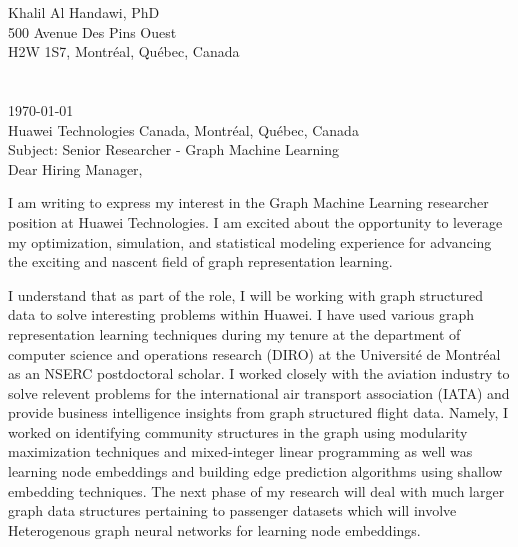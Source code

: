 \documentclass[12pt]{article} %
\begin{document}

Khalil Al Handawi, PhD\\
500 Avenue Des Pins Ouest\\
H2W 1S7, Montr\'{e}al, Qu\'{e}bec, Canada\\
\faPhone~~\cvnumberphone\\
\faEnvelope~~\href{mailto:\cvmail}{\cvmail}\\

\today\\

Huawei Technologies Canada, Montr\'{e}al, Qu\'{e}bec, Canada\\
Subject: Senior Researcher - Graph Machine Learning\\[6pt]


Dear Hiring Manager,

\medskip %

I am writing to express my interest in the Graph Machine Learning researcher position at Huawei Technologies. I am excited about the opportunity to leverage my optimization, simulation, and statistical modeling experience for advancing the exciting and nascent field of graph representation learning.

\medskip %

I understand that as part of the role, I will be working with graph structured data to solve interesting problems within Huawei. I have used various graph representation learning techniques during my tenure at the department of computer science and operations research (DIRO) at the Universit\'{e} de Montr\'{e}al as an NSERC postdoctoral scholar. I worked closely with the aviation industry to solve relevent problems for the international air transport association (IATA) and provide business intelligence insights from graph structured flight data. Namely, I worked on identifying community structures in the graph using modularity maximization techniques and mixed-integer linear programming as well was learning node embeddings and building edge prediction algorithms using shallow embedding techniques. The next phase of my research will deal with much larger graph data structures pertaining to passenger datasets which will involve Heterogenous graph neural networks for learning node embeddings.
\medskip %
\end{document}
